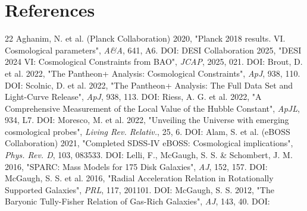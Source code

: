 \documentclass[11pt,a4paper]{article}
\begin{document}
\section{References}
{\scriptsize
\begin{thebibliography}{22}
 Aghanim, N. et al. (Planck Collaboration) 2020, "Planck 2018 results. VI. Cosmological parameters", \emph{A\&A}, 641, A6. DOI: \href{https://doi.org/10.1051/0004-6361/201833910}{{\small\protect{}}}
 DESI Collaboration 2025, "DESI 2024 VI: Cosmological Constraints from BAO", \emph{JCAP}, 2025, 021. DOI: \href{https://doi.org/10.1088/1475-7516/2025/02/021}{{\small\protect{}}}
 Brout, D. et al. 2022, "The Pantheon+ Analysis: Cosmological Constraints", \emph{ApJ}, 938, 110. DOI: \href{https://doi.org/10.3847/1538-4357/ac8e04}{{\small\protect{}}}
 Scolnic, D. et al. 2022, "The Pantheon+ Analysis: The Full Data Set and Light-Curve Release", \emph{ApJ}, 938, 113. DOI: \href{https://doi.org/10.3847/1538-4357/ac8b7a}{{\small\protect{}}}
 Riess, A. G. et al. 2022, "A Comprehensive Measurement of the Local Value of the Hubble Constant", \emph{ApJL}, 934, L7. DOI: \href{https://doi.org/10.3847/2041-8213/ac5c5b}{{\small\protect{}}}
 Moresco, M. et al. 2022, "Unveiling the Universe with emerging cosmological probes", \emph{Living Rev. Relativ.}, 25, 6. DOI: \href{https://doi.org/10.1007/s41114-022-00040-z}{{\small\protect{}}}
 Alam, S. et al. (eBOSS Collaboration) 2021, "Completed SDSS-IV eBOSS: Cosmological implications", \emph{Phys. Rev. D}, 103, 083533. DOI: \href{https://doi.org/10.1103/PhysRevD.103.083533}{{\small\protect{}}}
 Lelli, F., McGaugh, S. S. \& Schombert, J. M. 2016, "SPARC: Mass Models for 175 Disk Galaxies", \emph{AJ}, 152, 157. DOI: \href{https://doi.org/10.3847/0004-6256/152/6/157}{{\small\protect{}}}
 McGaugh, S. S. et al. 2016, "Radial Acceleration Relation in Rotationally Supported Galaxies", \emph{PRL}, 117, 201101. DOI: \href{https://doi.org/10.1103/PhysRevLett.117.201101}{{\small\protect{}}}
 McGaugh, S. S. 2012, "The Baryonic Tully-Fisher Relation of Gas-Rich Galaxies", \emph{AJ}, 143, 40. DOI: \href{https://doi.org/10.1088/0004-6256/143/2/40}{{\small\protect{}}}

\end{thebibliography}}
\end{document}
